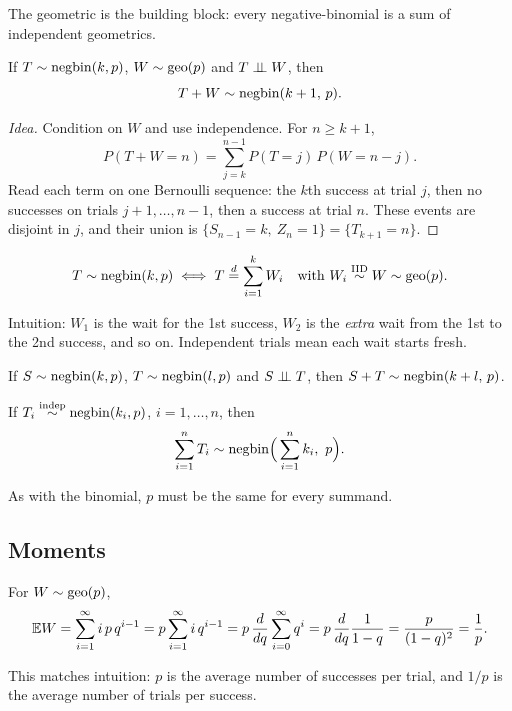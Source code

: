The geometric is the building block: every negative-binomial is a sum of independent geometrics.

\begin{proposition}
If $T \sim \operatorname{negbin}(k,p)$, $W \sim \operatorname{geo}(p)$ and $T \perp\!\!\!\perp W$, then
\[
T + W \sim \operatorname{negbin}(k+1,\,p).
\]
\end{proposition}
\begin{proof}[Idea]
Condition on $W$ and use independence. For $n \ge k+1$,
\[
P(T + W = n) = \sum_{j=k}^{n-1} P(T = j)\,P(W = n - j).
\]
Read each term on one Bernoulli sequence: the $k$th success at trial $j$, then no successes on trials $j+1,\dots,n-1$, then a success at trial $n$. These events are disjoint in $j$, and their union is $\{S_{n-1} = k,\ Z_n = 1\} = \{T_{k+1} = n\}$.
\end{proof}

\begin{corollary}
\[
T \sim \operatorname{negbin}(k,p) \iff T \overset{d}{=} \sum_{i=1}^{k} W_i \quad \text{with } W_i \overset{\text{IID}}{\sim} W \sim \operatorname{geo}(p).
\]
\end{corollary}
\begin{remark}
Intuition: $W_1$ is the wait for the 1st success, $W_2$ is the \emph{extra} wait from the 1st to the 2nd success, and so on. Independent trials mean each wait starts fresh.
\end{remark}

\begin{corollary}
If $S \sim \operatorname{negbin}(k,p)$, $T \sim \operatorname{negbin}(l,p)$ and $S \perp\!\!\!\perp T$, then $S + T \sim \operatorname{negbin}(k+l,\,p)$.
\end{corollary}

\begin{corollary}
If $T_i \overset{\text{indep}}{\sim} \operatorname{negbin}(k_i, p)$, $i = 1,\dots,n$, then
\[
\sum_{i=1}^{n} T_i \sim \operatorname{negbin}\!\Big(\sum_{i=1}^{n} k_i,\ p\Big).
\]
\end{corollary}
\begin{remark}
As with the binomial, $p$ must be the same for every summand.
\end{remark}

\subsection{Moments}

\begin{proposition}
For $W \sim \operatorname{geo}(p)$,
\[
\mathbb{E} W = \sum_{i=1}^{\infty} i\,p\,q^{i-1} = p \sum_{i=1}^{\infty} i\,q^{i-1} = p\,\frac{d}{dq}\sum_{i=0}^{\infty} q^i = p\,\frac{d}{dq}\frac{1}{1-q} = \frac{p}{(1-q)^2} = \frac{1}{p}.
\]
\end{proposition}
\begin{remark}
This matches intuition: $p$ is the average number of successes per trial, and $1/p$ is the average number of trials per success.
\end{remark}

